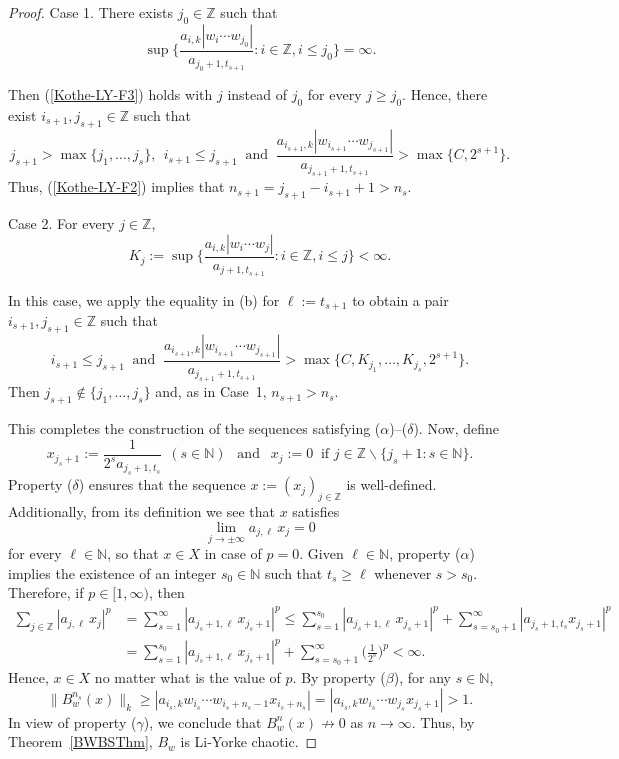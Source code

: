\documentclass[12pt]{amsart}
\theoremstyle{theorem}
\theoremstyle{definition}
\theoremstyle{remark} \theoremstyle{question} \theoremstyle{example}
\newcommand{\N}{\mathbb{N}}
\newcommand{\Z}{\mathbb{Z}}
\begin{document}
\begin{proof}
\medskip\noindent
{\sc Case 1.} There exists $j_0 \in \Z$ such that
\begin{equation}\label{Kothe-LY-F3}
\sup\Big\{\frac{a_{i,k} |w_i \cdots w_{j_0}|}{a_{j_0 + 1,t_{s+1}}} : i \in \Z, i \leq j_0\Big\} = \infty.
\end{equation}

\smallskip
Then (\ref{Kothe-LY-F3}) holds with $j$ instead of $j_0$ for every $j \geq j_0$.
Hence, there exist $i_{s+1},j_{s+1} \in \Z$ such that
\[
j_{s+1} > \max\{j_1,\ldots,j_s\}, \ \ i_{s+1} \leq j_{s+1} \ \text{ and } \ 
\frac{a_{i_{s+1},k} |w_{i_{s+1}} \cdots w_{j_{s+1}}|}{a_{j_{s+1} + 1,t_{s+1}}} > \max\{C,2^{s+1}\}.
\]
Thus, (\ref{Kothe-LY-F2}) implies that $n_{s+1} = j_{s+1} - i_{s+1} + 1 > n_s$.
 
\medskip\noindent
{\sc Case 2.} For every $j \in \Z$,
\begin{equation}\label{Kothe-LY-F4}
K_j\!:= \sup\Big\{\frac{a_{i,k} |w_i \cdots w_j|}{a_{j+1,t_{s+1}}} : i \in \Z, i \leq j\Big\} < \infty.
\end{equation}

\smallskip
In this case, we apply the equality in (b) for $\ell\!:= t_{s+1}$ to obtain a pair $i_{s+1},j_{s+1} \in \Z$ such that
\[
i_{s+1} \leq j_{s+1} \ \text{ and } \ 
\frac{a_{i_{s+1},k} |w_{i_{s+1}} \cdots w_{j_{s+1}}|}{a_{j_{s+1} + 1,t_{s+1}}} > \max\{C,K_{j_1},\ldots,K_{j_s},2^{s+1}\}.
\]
Then $j_{s+1} \not\in \{j_1,\ldots,j_s\}$ and, as in Case~1, $n_{s+1} > n_s$.

\smallskip
This completes the construction of the sequences satisfying ($\alpha$)--($\delta$). Now, define
\[
x_{j_s + 1}\!:= \frac{1}{2^s a_{j_s + 1,t_s}} \ \ (s \in \N) \ \ \text{ and } \ \ x_j\!:= 0 \ \text{ if } j \in \Z \backslash \{j_s + 1 : s \in \N\}.
\]
Property ($\delta$) ensures that the sequence $x\!:= (x_j)_{j \in \Z}$ is well-defined.
Additionally, from its definition we see that $x$ satisfies
\[
\lim_{j \to \pm \infty} a_{j,\ell}\, x_j = 0
\]
for every $\ell \in \N$, so that $x \in X$ in case of $p = 0$.
Given $\ell \in \N$, property ($\alpha$) implies the existence of an integer $s_0 \in \N$ such that $t_s \geq \ell$ whenever $s > s_0$.
Therefore, if $p \in [1,\infty)$, then
\begin{align*}
\sum_{j \in \Z} |a_{j,\ell}\, x_j|^p &= \sum_{s=1}^\infty |a_{j_s + 1,\ell}\, x_{j_s + 1}|^p
  \leq \sum_{s=1}^{s_0} |a_{j_s + 1,\ell}\, x_{j_s + 1}|^p + \sum_{s=s_0+1}^\infty |a_{j_s + 1,t_s} x_{j_s + 1}|^p\\
  &= \sum_{s=1}^{s_0} |a_{j_s + 1,\ell}\, x_{j_s + 1}|^p + \sum_{s=s_0+1}^\infty \Big(\frac{1}{2^s}\Big)^p < \infty.
\end{align*}
Hence, $x \in X$ no matter what is the value of $p$.
By property ($\beta$), for any $s \in \N$,
\[
\|B_w^{n_s}(x)\|_k \geq |a_{i_s,k} w_{i_s} \cdots w_{i_s + n_s - 1} x_{i_s + n_s}| = |a_{i_s,k} w_{i_s} \cdots w_{j_s} x_{j_s + 1}| > 1.
\]
In view of property ($\gamma$), we conclude that $B_w^n(x) \not\to 0$ as $n \to \infty$.
Thus, by Theorem~\ref{BWBSThm}, $B_w$ is Li-Yorke chaotic.


\end{proof}
\end{document}
